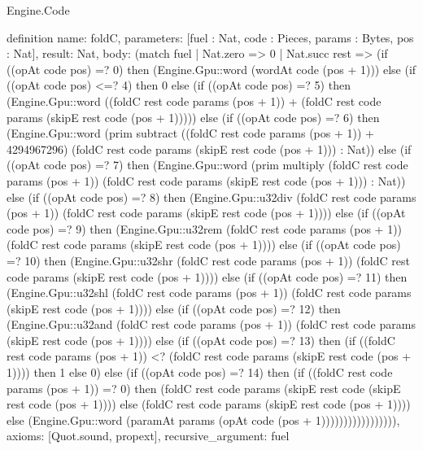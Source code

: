 \begin{lexlean}{Engine.Code}
\begin{semanticmodule}
definition{
  name: foldC,
  parameters: [fuel : Nat, code : Pieces, params : Bytes, pos : Nat],
  result: Nat,
  body: (match fuel
    | Nat.zero => 0
    | Nat.succ rest => (if ((opAt code pos) =? 0) then (Engine.Gpu::word (wordAt code (pos + 1))) else (if ((opAt code pos) <=? 4) then 0 else (if ((opAt code pos) =? 5) then (Engine.Gpu::word ((foldC rest code params (pos + 1)) + (foldC rest code params (skipE rest code (pos + 1))))) else (if ((opAt code pos) =? 6) then (Engine.Gpu::word (prim subtract ((foldC rest code params (pos + 1)) + 4294967296) (foldC rest code params (skipE rest code (pos + 1))) : Nat)) else (if ((opAt code pos) =? 7) then (Engine.Gpu::word (prim multiply (foldC rest code params (pos + 1)) (foldC rest code params (skipE rest code (pos + 1))) : Nat)) else (if ((opAt code pos) =? 8) then (Engine.Gpu::u32div (foldC rest code params (pos + 1)) (foldC rest code params (skipE rest code (pos + 1)))) else (if ((opAt code pos) =? 9) then (Engine.Gpu::u32rem (foldC rest code params (pos + 1)) (foldC rest code params (skipE rest code (pos + 1)))) else (if ((opAt code pos) =? 10) then (Engine.Gpu::u32shr (foldC rest code params (pos + 1)) (foldC rest code params (skipE rest code (pos + 1)))) else (if ((opAt code pos) =? 11) then (Engine.Gpu::u32shl (foldC rest code params (pos + 1)) (foldC rest code params (skipE rest code (pos + 1)))) else (if ((opAt code pos) =? 12) then (Engine.Gpu::u32and (foldC rest code params (pos + 1)) (foldC rest code params (skipE rest code (pos + 1)))) else (if ((opAt code pos) =? 13) then (if ((foldC rest code params (pos + 1)) <? (foldC rest code params (skipE rest code (pos + 1)))) then 1 else 0) else (if ((opAt code pos) =? 14) then (if ((foldC rest code params (pos + 1)) =? 0) then (foldC rest code params (skipE rest code (skipE rest code (pos + 1)))) else (foldC rest code params (skipE rest code (pos + 1)))) else (Engine.Gpu::word (paramAt params (opAt code (pos + 1))))))))))))))))),
  axioms: [Quot.sound, propext],
  recursive_argument: fuel
}


\end{semanticmodule}
\end{lexlean}
